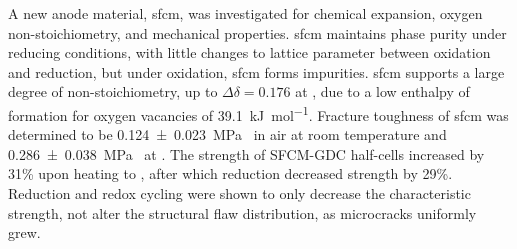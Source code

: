A new anode material, \gls{sfcm}, was investigated for chemical expansion, oxygen non-stoichiometry, and mechanical properties.
\Gls{sfcm} maintains phase purity under reducing conditions, with little changes to lattice parameter between oxidation and reduction, but under oxidation, \gls{sfcm} forms  impurities.
\Gls{sfcm} supports a large degree of non-stoichiometry, up to $\Delta\delta = 0.176$  at , due to a low enthalpy of formation for oxygen vacancies of \SI{39.1}{\kilo\joule\per\mol}.
Fracture toughness of \gls{sfcm} was determined to be \SI[separate-uncertainty = true]{0.124 +- 0.023}{\mega\pascal{}} in air at room temperature and \SI[separate-uncertainty = true]{0.286 +- 0.038}{\mega\pascal{}} at .
The strength of SFCM-GDC half-cells increased by 31\% upon heating to , after which reduction decreased strength by 29\%.
Reduction and redox cycling were shown to only decrease the characteristic strength, not alter the structural flaw distribution, as microcracks uniformly grew.
